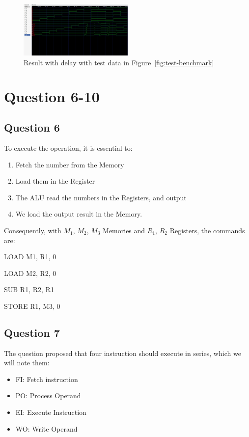\documentclass[conference]{IEEEtran}
\begin{document}
\begin{figure}[h!]
    \centering
    \includegraphics[width=0.5\textwidth]{assets/gtkwave.png}
    \caption{Result with delay with test data in Figure~\ref{fig:test-benchmark}}
    \label{fig:result-with-delay}
\end{figure}

\section{Question 6-10}

\subsection{Question 6}

To execute the operation, it is essential to:
\begin{enumerate}
    \item Fetch the number from the Memory
    \item Load them in the Register
    \item The ALU read the numbers in the Registers, and output
    \item We load the output result in the Memory.
\end{enumerate}

Consequently, with $M_1$, $M_2$, $M_3$ Memories and $R_1$, $R_2$ Registers, the commands are:

LOAD M1, R1, 0    

LOAD M2, R2, 0    

SUB R1, R2, R1    

STORE R1, M3, 0   

\subsection{Question 7}

The question proposed that four instruction should execute in series, which we will note them:
\begin{itemize}
    \item FI: Fetch instruction
    \item PO: Process Operand
    \item EI: Execute Instruction
    \item WO: Write Operand
\end{itemize}
\end{document}
